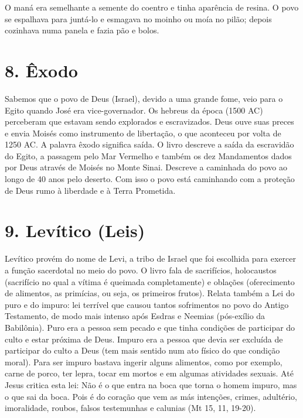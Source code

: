 \documentclass[
]{book}
\begin{document}
O maná era semelhante a semente do coentro e tinha aparência de resina. O povo se espalhava para juntá-lo e esmagava no moinho ou moía no pilão; depois cozinhava numa panela e fazia pão e bolos.

\hypertarget{uxeaxodo}{%
\section*{8. Êxodo}\label{uxeaxodo}}

Sabemos que o povo de Deus (Israel), devido a uma grande fome, veio para o Egito quando José era vice-governador. Os hebreus da época (1500 AC) perceberam que estavam sendo explorados e escravizados. Deus ouve suas preces e envia Moisés como instrumento de libertação, o que aconteceu por volta de 1250 AC. A palavra êxodo significa saída. O livro descreve a saída da escravidão do Egito, a passagem pelo Mar Vermelho e também os dez Mandamentos dados por Deus através de Moisés no Monte Sinai. Descreve a caminhada do povo ao longo de 40 anos pelo deserto. Com isso o povo está caminhando com a proteção de Deus rumo à liberdade e à Terra Prometida.

\hypertarget{levuxedtico-leis}{%
\section*{9. Levítico (Leis)}\label{levuxedtico-leis}}

Levítico provém do nome de Levi, a tribo de Israel que foi escolhida para exercer a função sacerdotal no meio do povo. O livro fala de sacrifícios, holocaustos (sacrifício no qual a vítima é queimada completamente) e oblações (oferecimento de alimentos, as primícias, ou seja, os primeiros frutos). Relata também a Lei do puro e do impuro: lei terrível que causou tantos sofrimentos no povo do Antigo Testamento, de modo mais intenso após Esdras e Neemias (pós-exílio da Babilônia). Puro era a pessoa sem pecado e que tinha condições de participar do culto e estar próxima de Deus. Impuro era a pessoa que devia ser excluída de participar do culto a Deus (tem mais sentido num ato físico do que condição moral). Para ser impuro bastava ingerir alguns alimentos, como por exemplo, carne de porco, ter lepra, tocar em mortos e em algumas atividades sexuais. Até Jesus critica esta lei: Não é o que entra na boca que torna o homem impuro, mas o que sai da boca. Pois é do coração que vem as más intenções, crimes, adultério, imoralidade, roubos, falsos testemunhas e calunias (Mt 15, 11, 19-20).
\end{document}
